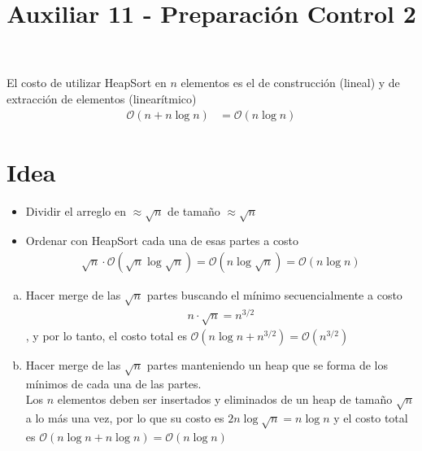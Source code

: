 \documentclass[dcc,sol]{fcfmcourse}
\title{Auxiliar 11 - Preparación Control 2}
\begin{document}
    \maketitle
    
    \vspace{-1ex}
    
    
    \begin{problems}
    
    \problem
    \problem El costo de utilizar HeapSort en $n$ elementos es el de construcción (lineal) y de extracción de elementos (linearítmico)
    \begin{align*}
        \mathcal{O}(n + n\log n) &= \mathcal{O}(n\log n)
    \end{align*}
    \section*{Idea}
    \begin{itemize}
        \item  Dividir el arreglo en $\approx \sqrt{n}$ de tamaño $\approx \sqrt{n}$
        \item Ordenar con HeapSort cada una de esas partes a costo
        \begin{align*}
            \sqrt{n}\cdot \mathcal{O}(\sqrt{n} \log{\sqrt{n}}) = \mathcal{O}(n\log{\sqrt{n}}) = \mathcal{O}(n\log n)
        \end{align*}
    \end{itemize}
    \begin{enumerate}[a)]
        \item Hacer merge de las $\sqrt{n}$ partes buscando el mínimo secuencialmente a costo
        \begin{align*}
            n \cdot \sqrt{n} = n^{3/2}
        \end{align*}
        , y por lo tanto, el costo total es $\mathcal{O}(n\log n + n ^{3/2}) = \mathcal{O}(n^{3/2})$
        \item Hacer merge de las $\sqrt{n}$ partes manteniendo un heap que se forma de los mínimos de cada una de las partes.\\
        
        Los $n$ elementos deben ser insertados y eliminados de un heap de tamaño $\sqrt{n}$ a lo más una vez, por lo que su costo es $2n\log{\sqrt{n}} = n\log n$ y el costo total es $\mathcal{O}(n\log n + n\log n) = \mathcal{O}(n\log n)$
    \end{enumerate}
    \problem
    \end{problems}
    
\end{document}
